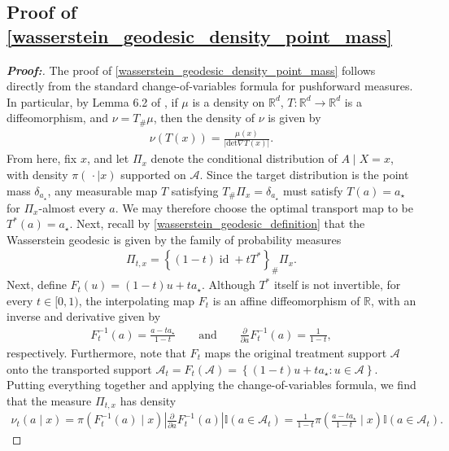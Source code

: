 \documentclass[11pt,twoside]{article}
\theoremstyle{definition}
\theoremstyle{remark}
\begin{document}
\subsection{Proof of \cref{wasserstein_geodesic_density_point_mass}} \label{wasserstein_geodesic_density_point_mass_proof}

\begin{proof}[\textbf{Proof:}] The proof of \cref{wasserstein_geodesic_density_point_mass} follows directly from the standard change-of-variables formula for pushforward measures. In particular, by Lemma 6.2 of \cite{chewi2024statistical}, if $\mu$ is a density on $\mathbb{R}^d$, $T : \mathbb{R}^d \to \mathbb{R}^d$ is a diffeomorphism, and $\nu = T_{\#}\mu$, then the density of $\nu$ is given by
\begin{align*}
    \nu(T(x)) = \frac{\mu(x)}{|\text{det} \nabla T(x)|}.
\end{align*}
From here, fix $x$, and let $\Pi_{x}$ denote the conditional distribution of $A \mid X=x$, with density $\pi(\, \cdot\mid x)$ supported on $\mathcal{A}$. Since the target distribution is the point mass $\delta_{a_\star}$, any measurable map $T$ satisfying $T_{\#}\Pi_{x}=\delta_{a_\star}$ must satisfy $T(a)=a_\star$ for $\Pi_x$-almost every $a$. We may therefore choose the optimal transport map to be $T^*(a)=a_\star$. Next, recall by \cref{wasserstein_geodesic_definition} that the Wasserstein geodesic is given by the family of probability measures
\begin{align*}
    \Pi_{t, x} = \left\{(1-t)\operatorname{id}+tT^* \right\}_{\#}\Pi_x.
\end{align*}
Next, define $F_t(u) = (1-t)u+ta_\star$. Although $T^*$ itself is not invertible, for every $t\in[0,1)$, the interpolating map $F_t$ is an affine diffeomorphism of $\mathbb{R}$, with an inverse and derivative given by
\begin{align*}
    F_t^{-1}(a) = \frac{a-ta_\star}{1-t} \qquad \text{and} \qquad  \frac{\partial}{\partial a}F_t^{-1}(a) = \frac{1}{1-t},
\end{align*}
respectively. Furthermore, note that $F_t$ maps the original treatment support $\mathcal{A}$ onto the transported support $\mathcal{A}_{t} = F_t(\mathcal{A}) = \left\{(1-t)u+ta_\star:u\in\mathcal{A}\right\}$. Putting everything together and applying the change-of-variables formula, we find that the measure $\Pi_{t,x}$ has density
\begin{align*}
    \nu_t(a\mid x) = \pi(F_t^{-1}(a)\mid x) \left| \frac{\partial}{\partial a} F_t^{-1}(a) \right| \mathbb{I}(a\in\mathcal{A}_{t}) = \frac{1}{1-t} \pi\left( \frac{a-ta_\star}{1-t} \mid x \right) \mathbb{I}(a\in\mathcal{A}_{t}).

\end{align*}
\end{proof}
\end{document}
